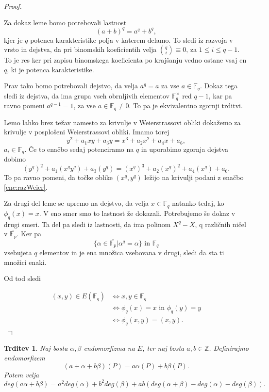 \documentclass[12pt,a4paper,twoside]{article}
\theoremstyle{definition} %
\theoremstyle{plain} %
\newtheorem{trditev}[definicija]{Trditev}
\numberwithin{equation}{section}  %
\newcommand{\Z}{\mathbb Z}
\newcommand{\F}{\mathbb F}
\begin{document}
\begin{proof}~

Za dokaz leme bomo potrebovali lastnost $$(a+b)^q = a^q+b^q,$$ kjer je $q$ potenca karakteristike polja v katerem delamo. To sledi iz razvoja v vrsto in dejstva, da pri binomskih koeficientih velja
${q\choose i} \equiv 0$, za $1 \leq i \leq q-1$. To je res ker pri zapisu binomskega koeficienta po krajšanju vedno ostane vsaj en $q$, ki je potenca karakteristike. 

Prav tako bomo potrebovali dejstvo, da velja $a^q = a$ za vse $a \in \F_q$. Dokaz tega sledi iz dejstva, da ima grupa vseh obrnljivih elementov $\F^{\times}_q$ red $q-1$, kar pa ravno pomeni $a^{q-1} = 1$, za vse $a \in \F_q \neq 0$. To pa je ekvivalentno zgornji trditvi.

Lemo lahko brez težav namesto za krivulje v Weierstrassovi obliki dokažemo za krivulje v posplošeni Weierstrassovi obliki.
Imamo torej
\begin{equation}
\label{enc:razWeier}
y^2+a_1xy+a_3y=x^3+a_2x^2+a_4x+a_6,
\end{equation}
$a_i \in \F_q$. Če to enačbo sedaj potenciramo na $q$ in uporabimo zgornja dejstva dobimo
$$(y^q)^2+a_1(x^qy^q)+a_3(y^q)=(x^q)^3+a_2(x^q)^2+a_4(x^q)+a_6.$$
To pa ravno pomeni, da točke oblike $(x^q,y^q)$ ležijo na krivulji podani z enačbo \ref{enc:razWeier}.

Za drugi del leme se upremo na dejstvo, da velja $x \in \F_q$ natanko tedaj, ko $\phi_q(x) = x$. V eno smer smo to lastnost že dokazali. Potrebujemo še dokaz v drugi smeri. Ta del pa sledi iz lastnosti, da ima polinom $X^q-X$, q različnih ničel v $\overline{\F_p}$. Ker pa
$$\{ \alpha \in \overline{\F_p} | \alpha^q = \alpha \} \text{ in } \F_q$$
vsebujeta $q$ elementov in je ena množica vsebovana v drugi, sledi da sta ti množici enaki.

Od tod sledi

\begin{align}
(x,y) \in E(\F_q) &{}\Leftrightarrow x,y \in \F_q \nonumber \\
&{}  \Leftrightarrow \phi_q(x) = x \text{ in } \phi_q(y) = y  \nonumber \\
&{} \Leftrightarrow \phi_q(x,y) = (x,y). \nonumber
\end{align} 

\end{proof}

\begin{trditev}
\label{trd:3.16}
Naj bosta $\alpha,\beta$ endomorfizma na $E$, ter naj bosta $a,b \in \Z$. Definirajmo endomorfizem
$$(a+\alpha+b\beta)(P) = a\alpha(P)+b\beta(P).$$
Potem velja
$$deg(a\alpha+b\beta) = a^2deg(\alpha)+b^2deg(\beta) + ab(deg(\alpha+\beta)-deg(\alpha)-deg(\beta)).$$
\end{trditev}
\end{document}

